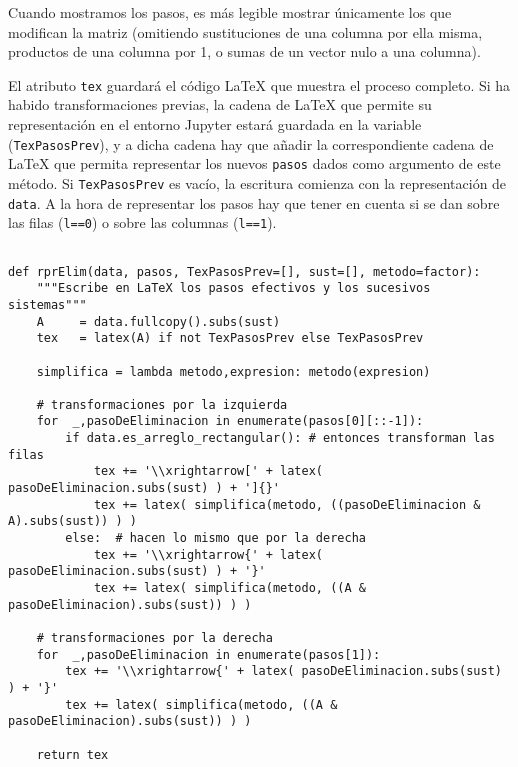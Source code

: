 \documentclass[11pt]{report}
\begin{document}
Cuando mostramos los pasos, es más legible mostrar únicamente los
que modifican la matriz (omitiendo sustituciones de una columna por
ella misma, productos de una columna por 1, o sumas de un vector nulo
a una columna). 

El atributo \texttt{tex} guardará el código \LaTeX{} que muestra el proceso
completo. Si ha habido transformaciones previas, la cadena de \LaTeX{}
que permite su representación en el entorno Jupyter estará guardada en
la variable (\texttt{TexPasosPrev}), y a dicha cadena hay que añadir la
correspondiente cadena de \LaTeX{} que permita representar los nuevos \texttt{pasos} dados como argumento de este método. Si \texttt{TexPasosPrev} es
vacío, la escritura comienza con la representación de \texttt{data}. A la
hora de representar los pasos hay que tener en cuenta si se dan sobre
las filas (\texttt{l==0}) o sobre las columnas (\texttt{l==1}). 

\begin{verbatim}

def rprElim(data, pasos, TexPasosPrev=[], sust=[], metodo=factor):
    """Escribe en LaTeX los pasos efectivos y los sucesivos sistemas"""
    A     = data.fullcopy().subs(sust)
    tex   = latex(A) if not TexPasosPrev else TexPasosPrev

    simplifica = lambda metodo,expresion: metodo(expresion) 
    
    # transformaciones por la izquierda
    for  _,pasoDeEliminacion in enumerate(pasos[0][::-1]):
        if data.es_arreglo_rectangular(): # entonces transforman las filas
            tex += '\\xrightarrow[' + latex( pasoDeEliminacion.subs(sust) ) + ']{}' 
            tex += latex( simplifica(metodo, ((pasoDeEliminacion & A).subs(sust)) ) )
        else:  # hacen lo mismo que por la derecha
            tex += '\\xrightarrow{' + latex( pasoDeEliminacion.subs(sust) ) + '}'
            tex += latex( simplifica(metodo, ((A & pasoDeEliminacion).subs(sust)) ) )
        
    # transformaciones por la derecha
    for  _,pasoDeEliminacion in enumerate(pasos[1]):
        tex += '\\xrightarrow{' + latex( pasoDeEliminacion.subs(sust) ) + '}'
        tex += latex( simplifica(metodo, ((A & pasoDeEliminacion).subs(sust)) ) )
                
    return tex

\end{verbatim}
\end{document}
